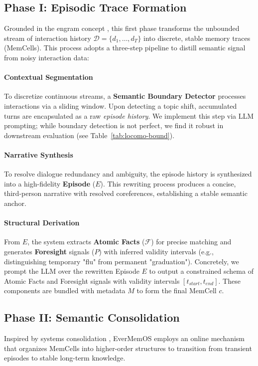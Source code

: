 \subsection{Phase I: Episodic Trace Formation}
Grounded in the engram concept \cite{josselyn2015finding}, this first phase transforms the unbounded stream of interaction history $\mathcal{D}=\{d_1,\ldots,d_T\}$ into discrete, stable memory traces (MemCells). This process adopts a three-step pipeline to distill semantic signal from noisy interaction data:

\paragraph{Contextual Segmentation} To discretize continuous streams, a \textbf{Semantic Boundary Detector} processes interactions via a sliding window. Upon detecting a topic shift, accumulated turns are encapsulated as a raw \textit{episode history}. We implement this step via LLM prompting; while boundary detection is not perfect, we find it robust in downstream evaluation (see Table~\ref{tab:locomo-bound}).

\paragraph{Narrative Synthesis} To resolve dialogue redundancy and ambiguity, the episode history is synthesized into a high-fidelity \textbf{Episode} ($E$). This rewriting process produces a concise, third-person narrative with resolved coreferences, establishing a stable semantic anchor.

\paragraph{Structural Derivation} From $E$, the system extracts \textbf{Atomic Facts} ($\mathcal{F}$) for precise matching and generates \textbf{Foresight} signals ($P$) with inferred validity intervals (e.g., distinguishing temporary "flu" from permanent "graduation"). Concretely, we prompt the LLM over the rewritten Episode $E$ to output a constrained schema of Atomic Facts and Foresight signals with validity intervals $[t_{start}, t_{end}]$. These components are bundled with metadata $M$ to form the final MemCell $c$.


\subsection{Phase II: Semantic Consolidation}
Inspired by systems consolidation \cite{mcgaugh2000memory}, EverMemOS employs an online mechanism that organizes MemCells into higher-order structures to transition from transient episodes to stable long-term knowledge.

